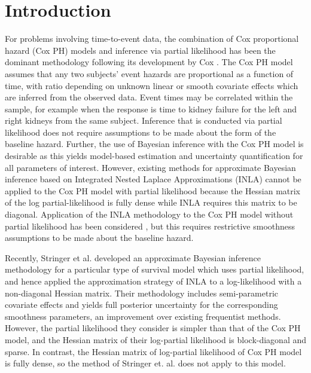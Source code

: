 \documentclass[AMA,STIX1COL,doublespace]{WileyNJD-v2}
\begin{document}
\maketitle



\section{Introduction}\label{sec1}

For problems involving time-to-event data, the combination of Cox proportional hazard (Cox PH) models and inference via partial likelihood has been the dominant methodology following its development by Cox \cite{coxph}. The Cox PH model assumes that any two subjects' event hazards are proportional as a function of time, with ratio depending on unknown linear or smooth covariate effects which are inferred from the observed data. Event times may be correlated within the sample, for example when the response is time to kidney failure for the left and right kidneys from the same subject. Inference that is conducted via partial likelihood does not require assumptions to be made about the form of the baseline hazard. Further, the use of Bayesian inference with the Cox PH model is desirable as this yields model-based estimation and uncertainty quantification for all parameters of interest. However, existing methods for approximate Bayesian inference based on Integrated Nested Laplace Approximations (INLA) \cite{inla} cannot be applied to the Cox PH model with partial likelihood because the Hessian matrix of the log partial-likelihood is fully dense while INLA requires this matrix to be diagonal. Application of the INLA methodology to the Cox PH model without partial likelihood has been considered \cite{inlacoxph}, but this requires restrictive smoothness assumptions to be made about the baseline hazard.

Recently, Stringer et al. \cite{casecross} developed an approximate Bayesian inference methodology for a particular type of survival model which uses partial likelihood, and hence applied the approximation strategy of INLA to a log-likelihood with a non-diagonal Hessian matrix. Their methodology includes semi-parametric covariate effects and yields full posterior uncertainty for the corresponding smoothness parameters, an improvement over existing frequentist methods. However, the partial likelihood they consider is simpler than that of the Cox PH model, and the Hessian matrix of their log-partial likelihood is block-diagonal and sparse. In contrast, the Hessian matrix of log-partial likelihood of Cox PH model is fully dense, so the method of Stringer et. al. \cite{casecross} does not apply to this model.
\end{document}
